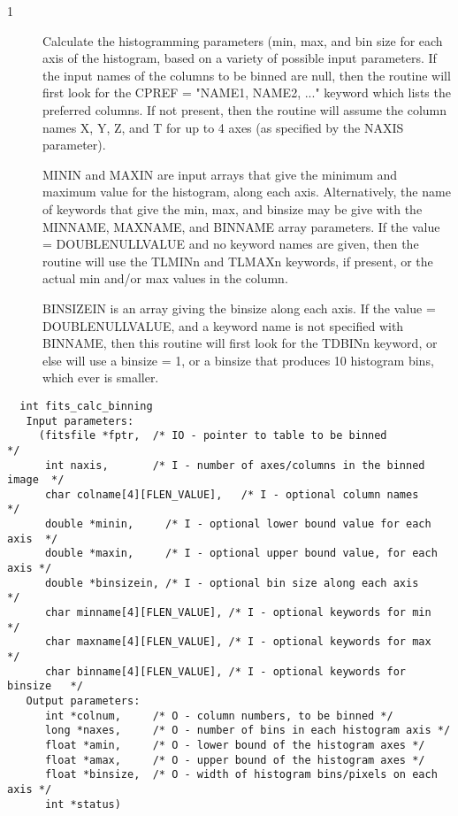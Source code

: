 \documentclass[11pt]{book}
\begin{document}
\begin{description}
\item[1 ]  Calculate the histogramming parameters (min, max, and bin size
for each axis of the histogram, based on a variety of possible input parameters.
If the input names of the columns to be binned are null, then the routine will first
look for the CPREF = "NAME1, NAME2, ..." keyword which lists the preferred
columns.  If not present, then the routine will assume the column names X, Y, Z, and T
for up to 4 axes (as specified by the NAXIS parameter).

MININ and MAXIN are input arrays that give the minimum and maximum value for
the histogram, along each axis.  Alternatively, the name of keywords that give
the min, max, and binsize may be give with the MINNAME, MAXNAME, and BINNAME
array parameters.  If the value = DOUBLENULLVALUE and no keyword names are
given,  then the routine will use the TLMINn and TLMAXn keywords, if present, or the
actual min and/or max values in the column.

BINSIZEIN is an array giving the binsize along each axis.
If the value =
DOUBLENULLVALUE, and a keyword name is not specified with BINNAME,
then this routine will first look for the TDBINn keyword, or else will
use a binsize = 1, or a binsize that produces 10 histogram bins, which ever
is smaller.
 \label{calcbinning}
\end{description}

\begin{verbatim}
  int fits_calc_binning
   Input parameters:
     (fitsfile *fptr,  /* IO - pointer to table to be binned              */
      int naxis,       /* I - number of axes/columns in the binned image  */
      char colname[4][FLEN_VALUE],   /* I - optional column names         */
      double *minin,     /* I - optional lower bound value for each axis  */
      double *maxin,     /* I - optional upper bound value, for each axis */
      double *binsizein, /* I - optional bin size along each axis         */
      char minname[4][FLEN_VALUE], /* I - optional keywords for min       */
      char maxname[4][FLEN_VALUE], /* I - optional keywords for max       */
      char binname[4][FLEN_VALUE], /* I - optional keywords for binsize   */
   Output parameters:
      int *colnum,     /* O - column numbers, to be binned */
      long *naxes,     /* O - number of bins in each histogram axis */
      float *amin,     /* O - lower bound of the histogram axes */
      float *amax,     /* O - upper bound of the histogram axes */
      float *binsize,  /* O - width of histogram bins/pixels on each axis */
      int *status)
\end{verbatim}
\end{document}
